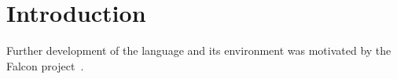 \chapter{Introduction}
\label{chap:introduction}




%


%
Further development of the \SLCO language and its environment was motivated by the  Falcon project~\cite{Falcon2011}.




